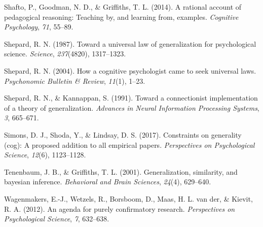 \documentclass[
  english,
  doc]{apa6}
\begin{document}
\leavevmode\hypertarget{ref-shafto2014rational}{}%
Shafto, P., Goodman, N. D., \& Griffiths, T. L. (2014). A rational account of pedagogical reasoning: Teaching by, and learning from, examples. \emph{Cognitive Psychology}, \emph{71}, 55--89.

\leavevmode\hypertarget{ref-shepard1987toward}{}%
Shepard, R. N. (1987). Toward a universal law of generalization for psychological science. \emph{Science}, \emph{237}(4820), 1317--1323.

\leavevmode\hypertarget{ref-shepard2004cognitive}{}%
Shepard, R. N. (2004). How a cognitive psychologist came to seek universal laws. \emph{Psychonomic Bulletin \& Review}, \emph{11}(1), 1--23.

\leavevmode\hypertarget{ref-shepard1991toward}{}%
Shepard, R. N., \& Kannappan, S. (1991). Toward a connectionist implementation of a theory of generalization. \emph{Advances in Neural Information Processing Systems}, \emph{3}, 665--671.

\leavevmode\hypertarget{ref-simons2017constraints}{}%
Simons, D. J., Shoda, Y., \& Lindsay, D. S. (2017). Constraints on generality (cog): A proposed addition to all empirical papers. \emph{Perspectives on Psychological Science}, \emph{12}(6), 1123--1128.

\leavevmode\hypertarget{ref-tenenbaum2001generalization}{}%
Tenenbaum, J. B., \& Griffiths, T. L. (2001). Generalization, similarity, and bayesian inference. \emph{Behavioral and Brain Sciences}, \emph{24}(4), 629--640.

\leavevmode\hypertarget{ref-Wagenmakers2012}{}%
Wagenmakers, E.-J., Wetzels, R., Borsboom, D., Maas, H. L. van der, \& Kievit, R. A. (2012). An agenda for purely confirmatory research. \emph{Perspectives on Psychological Science}, \emph{7}, 632--638.
\end{document}
